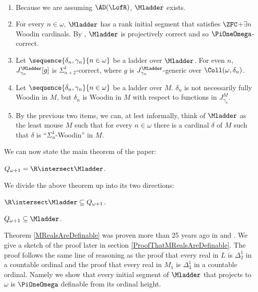 \documentclass[oneside,12pt]{amsart}
\begin{document}
\begin{remarks} \
\begin{enumerate}
\item Because we are assuming $\AD(\LofR)$, $\Mladder$ exists.
\item For every $n\in\omega$, $\Mladder$ has a rank initial segment that satisfies
$\ZFC$+$\exists n$ Woodin cardinals.  By \cite{Proj_WO_In_Mod}, $\Mladder$ is projectively correct and so $\PiOneOmega$-correct.
\item Let $\sequence{\delta_n,\gamma_n}{n\in\omega}$ be a ladder over $\Mladder$.
For even $n$, $J^{\Mladder}_{\gamma_n}[g]$ is $\Sigma^1_{n+2}$-correct,
where $g$ is $J^{\Mladder}_{\gamma_n}$-generic over $\Coll(\omega,\delta_n)$.
\item Let $\sequence{\delta_n,\gamma_n}{n\in\omega}$ be a ladder over $M$.
$\delta_n$ is not necessarily fully Woodin in $M$, but $\delta_n$ is Woodin in $M$
with respect to functions in $J^M_{\gamma_n}$.
\item By the previous two items, we can, at lest informally, think of
$\Mladder$ as the least mouse
$M$ such that for every $n\in\omega$ there is a cardinal $\delta$ of $M$ such
that $\delta$ is ``$\Sigma^1_n$-Woodin'' in $M$.
\end{enumerate}
\end{remarks}

We can now state the main theorem of the paper:

\begin{theorem}
$Q_{\omega+1} = \R \intersect \Mladder$.
\end{theorem}

We divide the above theorem up into its two directions:

\begin{theorem}
\label{MRealsAreDefinable}
$\R \intersect \Mladder \subseteq Q_{\omega+1}$.
\end{theorem}

\begin{theorem}
\label{DefinableRealsAreInM}
$Q_{\omega+1} \subseteq \Mladder$.
\end{theorem}

Theorem \ref{MRealsAreDefinable} was proven more than 25 years ago in
\cite{My_Thesis} and \cite{Mouse_Sets}. We give a sketch of the proof later
in section \ref{ProofThatMRealsAreDefinable}. The proof follows the same
line of reasoning as the proof that every real in $L$ is $\Delta^1_2$ in a
countable ordinal and the proof that every real in $M_1$ is $\Delta^1_3$ in
a countable ordinal. Namely we show that every initial segment of $\Mladder$
that projects to $\omega$ is $\PiOneOmega$ definable from its ordinal height.
\end{document}
